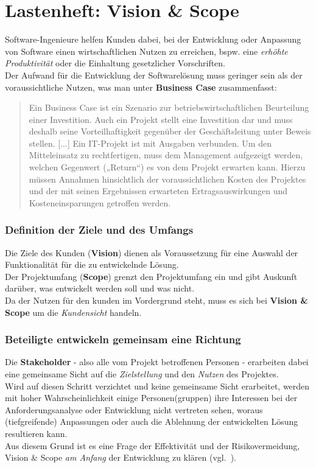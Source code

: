 \section{Lastenheft: Vision \& Scope}\label{sec:lastenheft-vision-scope}

Software-Ingenieure helfen Kunden dabei, bei der Entwicklung oder Anpassung von Software einen wirtschaftlichen Nutzen zu erreichen, bspw. eine \textit{erhöhte Produktivität} oder die Einhaltung gesetzlicher Vorschriften.\\
Der Aufwand für die Entwicklung der Softwarelösung muss geringer sein als der voraussichtliche Nutzen, was man unter \textbf{Business Case} zusammenfasst:

\blockquote[{\cite[11]{Brug09}}]{
    Ein Business Case ist ein Szenario zur betriebswirtschaftlichen Beurteilung einer Investition.
    Auch ein Projekt stellt eine Investition dar und
    muss deshalb seine Vorteilhaftigkeit gegenüber der Geschäftsleitung unter
    Beweis stellen. [...] Ein IT-Projekt ist mit Ausgaben verbunden. Um den Mitteleinsatz zu rechtfertigen, muss dem Management
    aufgezeigt werden, welchen Gegenwert („Return“) es von dem Projekt erwarten kann. Hierzu müssen Annahmen hinsichtlich der voraussichtlichen
    Kosten des Projektes und der mit seinen Ergebnissen erwarteten Ertragsauswirkungen und Kosteneinsparungen getroffen werden.
}

\subsubsection*{Definition der Ziele und des Umfangs}
Die Ziele des Kunden (\textbf{Vision}) dienen als Voraussetzung für eine Auswahl der Funktionalität für die zu entwickelnde Lösung.\\
Der Projektumfang (\textbf{Scope}) grenzt den Projektumfang ein und gibt Auskunft darüber, was entwickelt werden soll und was nicht.\\
Da der Nutzen für den kunden im Vordergrund steht, muss es sich bei \textbf{Vision \& Scope} um die \textit{Kundensicht} handeln.\\

\subsubsection*{Beteiligte entwickeln gemeinsam eine Richtung}
Die \textbf{Stakeholder} - also alle vom Projekt betroffenen Personen - erarbeiten dabei eine gemeinsame Sicht auf die \textit{Zielstellung} und den \textit{Nutzen} des Projektes.\\
Wird auf diesen Schritt verzichtet und keine gemeinsame Sicht erarbeitet, werden mit hoher Wahrscheinlichkeit einige Personen(gruppen) ihre Interessen bei der Anforderungsanalyse oder  Entwicklung nicht vertreten sehen, woraus (tiefgreifende) Anpassungen oder auch die Ablehnung der entwickelten Lösung resultieren kann.\\
Aus diesem Grund ist es eine Frage der Effektivität und der Risikovermeidung, Vision \& Scope \textit{am Anfang} der Entwicklung zu klären (vgl.~\cite[44]{Wed09}).


